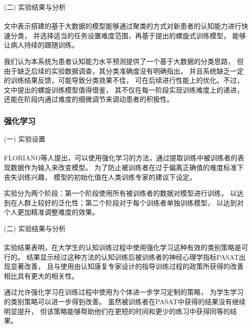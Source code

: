 \documentclass{article}
\begin{document}
            


            (二) 实验结果与分析\paragraph{}
            文中表示搭建的基于大数据的模型能够通过聚类的方式对新患者的认知能力进行快速分类，
            并选择适当的任务设置难度范围，再基于提出的螺旋式训练模型，
            能够让病人持续的跟随训练。

            我们认为本系统为患者认知能力水平预测提供了一个基于大数据的分类思路，
            但由于缺乏后续的实验数据调查，其分类准确度没有明确指出，
            并且系统缺乏一定的训练结果反馈，可能导致分类效果不佳，
            可在后续进行性能上的优化。不过，文中提出的螺旋训练模型值得借鉴，
            其不仅在每一阶段实现训练难度上的递进，
            还能在阶段内通过难度的细微调节来调动患者的积极性。






            \subsubsection{强化学习}
            (一) 实验设置\paragraph{}
            FLORIANO\cite{ref11}等人提出，可以使用强化学习的方法，通过提取训练中被训练者的表现数据作为输入来改变模型。
            为了防止被训练者在过于偏离正确值的难度标准下丧失训练兴趣，
            模型的初始化值在人类训练专家的建议下设定。

            实验分为两个阶段：第一个阶段使用所有被训练者的数据对模型进行训练，
            以达到在人群上较好的泛化性；第二个阶段对于每个训练者单独训练模型，
            以达到对个人更加精准调整难度的效果。

            (二) 实验结果与分析\paragraph{}
            实验结果表明，在大学生的认知训练过程中使用强化学习这种有效的类别策略是可行的。
            结果显示经过这种方法的认知训练后被训练者的神经心理学指标PASAT出现显著改善，
            且与使用由认知康复专家设计的指导训练过程的政策所获得的改善相比具有更大的相关性。

            通过允许强化学习在训练过程中使用为个体进一步学习定制的策略，
            为学生学习的类别策略可以进一步得到改善。
            虽然被训练者在PASAT中获得的结果没有继续明显提升，
            但该策略能够帮助他们在更短的时间和更少的练习中获得同等的结果。
\end{document}
